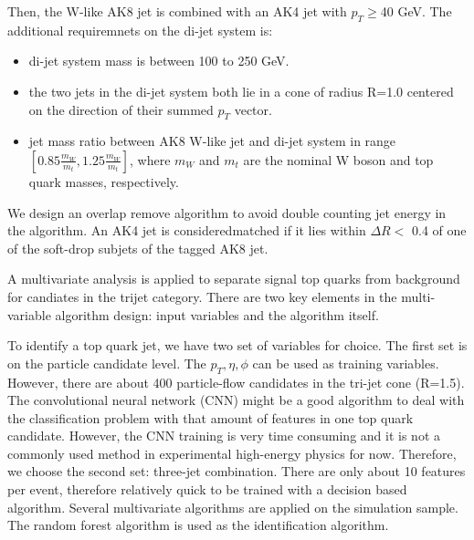 Then, the W-like AK8 jet is combined with an AK4 jet with $p_{T}\ge$40 GeV. The additional requiremnets on the di-jet system is:
\begin{itemize}
\item di-jet system mass is between 100 to 250 GeV.
\item the two jets in the di-jet system both lie in a cone of radius R=1.0 centered on the direction of their summed $p_{T}$ vector.
\item jet mass ratio between AK8 W-like jet and di-jet system in range $[ 0.85 \frac{m_{W}}{m_{t}}, 1.25 \frac{m_{W}}{m_{t}} ]$, where $m_{W}$ and $m_{t}$ are the nominal W boson and top quark masses, respectively.
\end{itemize}

We design an overlap remove algorithm to avoid double counting jet energy in the algorithm. An AK4 jet is consideredmatched if it lies within $\Delta R <$ 0.4 of one of the soft-drop subjets of the tagged AK8 jet.

A multivariate analysis is applied to separate signal top quarks from background for candiates in the trijet category. There are two key elements in the multi-variable algorithm design: input variables and the algorithm itself. 


To identify a top quark jet, we have two set of variables for choice. The first set is on the particle candidate level. The $p_{T}, \eta, \phi$ can be used as training variables. However, there are about 400 particle-flow candidates in the tri-jet cone (R=1.5). The convolutional neural network\cite{NIPS2012_4824} (CNN) might be a good algorithm to deal with the classification problem with that amount of features in one top quark candidate. However, the CNN training is very time consuming and it is not a commonly used method in experimental high-energy physics for now. Therefore, we choose the second set: three-jet combination. There are only about 10 features per event, therefore relatively quick to be trained with a decision based algorithm. Several multivariate algorithms are applied on the simulation sample. The random forest algorithm\cite{Ho:1995:RDF:844379.844681} is used as the identification algorithm.


